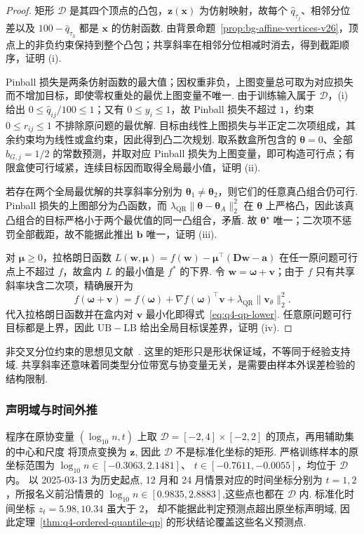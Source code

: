 \begin{proof}
矩形 $\mathcal D$ 是其四个顶点的凸包，$\boldsymbol z(\boldsymbol x)$ 为仿射映射，故每个
$\widehat q_{\tau_j}$、相邻分位差以及 $100-\widehat q_{\tau_3}$ 都是 $\boldsymbol x$ 的仿射函数. 由背景命题~\ref{prop:bg-affine-vertices-v26}，顶点上的非负约束保持到整个凸包；共享斜率在相邻分位相减时消去，得到截距顺序，证明 (i). 

Pinball 损失是两条仿射函数的最大值；因权重非负，上图变量总可取为对应损失而不增加目标，即使零权重处的最优上图变量不唯一. 由于训练输入属于 $\mathcal D$，(i) 给出 $0\le\widehat q_{ij}/100\le1$；又有 $0\le y_i\le1$，故 Pinball 损失不超过 $1$，约束 $0\le r_{ij}\le1$ 不排除原问题的最优解. 目标由线性上图损失与半正定二次项组成，其余约束均为线性或盒约束，因此得到凸二次规划. 取系数盒所包含的 $\boldsymbol\theta=0$、全部 $b_{G,j}=1/2$ 的常数预测，并取对应 Pinball 损失为上图变量，即可构造可行点；有限盒使可行域紧，连续目标因而取得全局最小值，证明 (ii). 

若存在两个全局最优解的共享斜率分别为 $\boldsymbol\theta_1\ne\boldsymbol\theta_2$，则它们的任意真凸组合仍可行. Pinball 损失的上图部分为凸函数，而
$\lambda_{\mathrm{QR}}\|\boldsymbol\theta-\boldsymbol\theta_A\|_2^2$ 在 $\boldsymbol\theta$ 上严格凸，因此该真凸组合的目标严格小于两个最优值的同一凸组合，矛盾. 故 $\boldsymbol\theta^\star$ 唯一；二次项不惩罚全部截距，故不能据此推出 $\boldsymbol b$ 唯一，证明 (iii). 

对 $\boldsymbol\mu\ge0$，拉格朗日函数
$L(\boldsymbol w,\boldsymbol\mu)=f(\boldsymbol w)-\boldsymbol\mu^\top(\mathbf D\boldsymbol w-\boldsymbol a)$
在任一原问题可行点上不超过 $f$，故盒内 $L$ 的最小值是 $f^*$ 的下界. 令
$\boldsymbol w=\boldsymbol\omega+\boldsymbol v$；由于 $f$ 只有共享斜率块含二次项，精确展开为
\[
f(\boldsymbol\omega+\boldsymbol v)
=f(\boldsymbol\omega)+\nabla f(\boldsymbol\omega)^\top\boldsymbol v
+\lambda_{\mathrm{QR}}\|\boldsymbol v_\theta\|_2^2.
\]
代入拉格朗日函数并在盒内对 $\boldsymbol v$ 最小化即得式~\eqref{eq:q4-qp-lower}. 任意原问题可行目标都是上界，因此 $\mathrm{UB}-\mathrm{LB}$ 给出全局目标误差界，证明 (iv). 
\end{proof}
非交叉分位约束的思想见文献~\cite{bondell_noncrossing}. 这里的矩形只是形状保证域，不等同于经验支持域. 共享斜率还意味着同类型分位带宽与协变量无关，是需要由样本外误差检验的结构限制. 

\subsubsection{声明域与时间外推}
程序在原协变量 $(\log_{10}n,t)$ 上取
$\mathcal D=[-2,4]\times[-2,2]$ 的顶点，再用辅助集的中心和尺度
将顶点变换为 $\boldsymbol z$, 因此 $\mathcal D$ 不是标准化坐标的矩形. 
严格训练样本的原坐标范围为
$\log_{10}n\in[-0.3063,2.1481]$、
$t\in[-0.7611,-0.0055]$，均位于 $\mathcal D$ 内。
以 2025-03-13 为历史起点, 12 月和 24 月情景对应的时间坐标分别为
$t=1,2$，所报名义前沿情景的
$\log_{10}n\in[0.9835,2.8883]$,这些点也都在 $\mathcal D$ 内.
标准化时间坐标 $z_t=5.98, 10.34$ 虽大于 $2$，
却不能据此判定预测点超出原坐标声明域, 
因此定理~\ref{thm:q4-ordered-quantile-qp} 的形状结论覆盖这些名义预测点.

